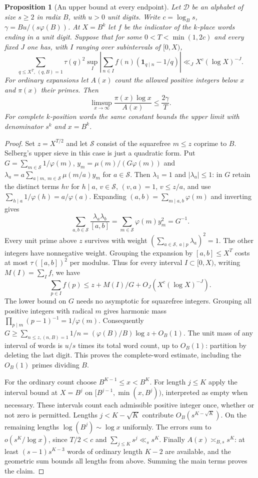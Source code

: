 \documentclass[11pt,a4paper]{article}
\theoremstyle{paperplain}
\newtheorem{proposition}[theorem]{Proposition}
\numberwithin{equation}{section}
\begin{document}
\begin{proposition}[An upper bound at every endpoint]\label{common:upper}
Let $\mathcal D$ be an alphabet of size $s\ge2$ in radix $B$, with
$u>0$ unit digits. Write $c=\log_Bs$, $\gamma=Bu/(s\varphi(B))$.
At $X=B^k$ let $f$ be the indicator of the $k$-place words ending in
a unit digit. Suppose that for some $0<T<\min(1,2c)$ and every fixed $J$
one has, with $I$ ranging over subintervals of $[0,X)$,
\[
 \sum_{q\le X^T,\ (q,B)=1}\tau(q)^2
 \sup_I\left|\sum_{n\in I}f(n)(\mathbf1_{q\mid n}-1/q)\right|
 \ll_J X^c(\log X)^{-J}.
\]
For ordinary expansions let $A(x)$ count the
allowed positive integers below $x$ and $\pi(x)$ their primes. Then
\[
 \limsup_{x\to\infty}\frac{\pi(x)\log x}{A(x)}\le \frac{2\gamma}{T}.
\]
For complete $k$-position words the same constant bounds the upper
limit with denominator $s^k$ and $x=B^k$.
\end{proposition}
\begin{proof}
Set $z=X^{T/2}$ and let $\mathcal S$ consist of the squarefree
$m\le z$ coprime to $B$. Selberg's upper sieve
\cite{FriedlanderIwaniec2010} in this case is just a quadratic form.
Put $G=\sum_{m\in\mathcal S}1/\varphi(m)$,
$y_m=\mu(m)/(G\varphi(m))$ and
$\lambda_a=a\sum_{a\mid m,\ m\in\mathcal S}\mu(m/a)y_m$ for $a\in\mathcal S$.
Then $\lambda_1=1$ and $|\lambda_a|\le1$: in $G$ retain the distinct
terms $hv$ for $h\mid a$, $v\in\mathcal S$, $(v,a)=1$, $v\le z/a$,
and use $\sum_{h\mid a}1/\varphi(h)=a/\varphi(a)$.
Expanding $(a,b)=\sum_{m\mid a,b}\varphi(m)$ and inverting gives
\[
 \sum_{a,b\in\mathcal S}\frac{\lambda_a\lambda_b}{[a,b]}
 =\sum_{m\in\mathcal S}\varphi(m)y_m^2=G^{-1}.
\]
Every unit prime above $z$ survives with weight
$(\sum_{a\in\mathcal S,\ a\mid p}\lambda_a)^2=1$.
The other integers have nonnegative weight. Grouping the expansion by
$[a,b]\le X^T$ costs at most $\tau([a,b])^2$ per modulus. Thus for
every interval $I\subset[0,X)$, writing $M(I)=\sum_{I} f$, we have
\[
 \sum_{p\in I} f(p)\le z+M(I)/G+O_J(X^c(\log X)^{-J}).
\]
The lower bound on $G$ needs no asymptotic for squarefree integers.
Grouping all positive integers with radical $m$ gives harmonic mass
$\prod_{p\mid m}(p-1)^{-1}=1/\varphi(m)$. Consequently
$G\ge\sum_{n\le z,(n,B)=1}1/n=(\varphi(B)/B)\log z+O_B(1)$.
The unit mass of any interval of words is $u/s$ times its total
word count, up to $O_B(1)$: partition by deleting the last digit.
This proves the complete-word estimate, including the $O_B(1)$
primes dividing $B$.

For the ordinary count choose $B^{K-1}\le x<B^K$. For length $j\le K$
apply the interval bound at $X=B^j$ on
$[B^{j-1},\min(x,B^j))$, interpreted as empty when necessary.
These intervals count each admissible positive integer once, whether
or not zero is permitted. Lengths $j<K-\sqrt K$ contribute
$O_B(s^{K-\sqrt K})$. On the remaining lengths
$\log(B^j)\sim\log x$ uniformly. The errors sum to
$o(s^K/\log x)$, since $T/2<c$ and $\sum_{j\le K}s^j\ll_s s^K$.
Finally $A(x)\asymp_{B,s}s^K$: at least $(s-1)s^{K-3}$ words of
ordinary length $K-2$ are available, and the geometric sum bounds
all lengths from above. Summing the main terms proves the claim.
\end{proof}
\end{document}
